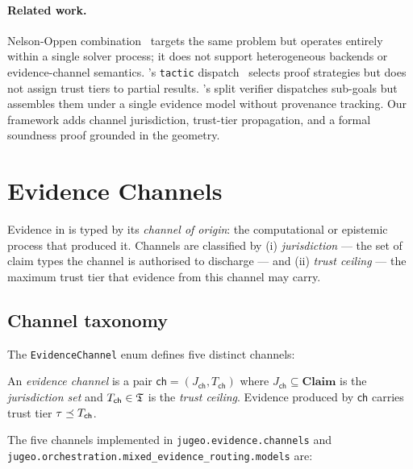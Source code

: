 \documentclass[11pt]{article}
\begin{document}
\paragraph{Related work.}
Nelson-Oppen combination~\cite{Nelson1979} targets the same problem but
operates entirely within a single solver process; it does not support
heterogeneous backends or evidence-channel semantics.  \Fstar's
\texttt{tactic} dispatch~\cite{Martinez2019} selects proof strategies
but does not assign trust tiers to partial results.  \Dafny's split
verifier dispatches sub-goals but assembles them under a single
evidence model without provenance tracking.  Our framework adds channel
jurisdiction, trust-tier propagation, and a formal soundness proof
grounded in the \JuGeo{} geometry.

\section{Evidence Channels}\label{sec:channels}

Evidence in \JuGeo{} is typed by its \emph{channel of origin}: the
computational or epistemic process that produced it.  Channels are
classified by (i) \emph{jurisdiction} — the set of claim types the
channel is authorised to discharge — and (ii) \emph{trust ceiling} —
the maximum trust tier that evidence from this channel may carry.

\subsection{Channel taxonomy}\label{sec:channel-taxonomy}

The \texttt{EvidenceChannel} enum defines five distinct channels:

\begin{definition}\label{def:channel}
An \emph{evidence channel} is a pair $\mathsf{ch} = (J_{\mathsf{ch}},
T_{\mathsf{ch}})$ where $J_{\mathsf{ch}} \subseteq \mathbf{Claim}$ is
the \emph{jurisdiction set} and $T_{\mathsf{ch}} \in \mathfrak{T}$ is the
\emph{trust ceiling}.  Evidence produced by $\mathsf{ch}$ carries trust
tier $\tau \preceq T_{\mathsf{ch}}$.
\end{definition}

The five channels implemented in \texttt{jugeo.evidence.channels} and
\texttt{jugeo.orchestration.mixed\_evidence\_routing.models} are:
\end{document}
